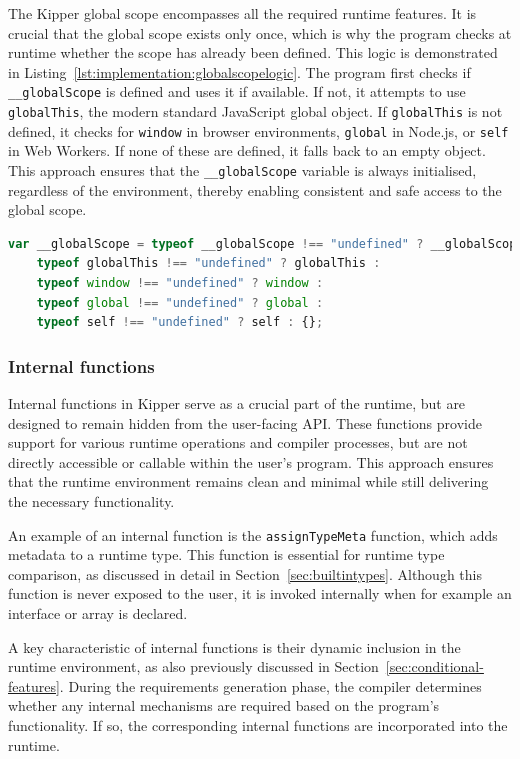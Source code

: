 The Kipper global scope encompasses all the required runtime features. It is crucial that the global scope exists only once, which is why the program checks at runtime whether the scope has already been defined. This logic is demonstrated in Listing~\ref{lst:implementation:globalscopelogic}. The program first checks if \lstinline|__globalScope| is defined and uses it if available. If not, it attempts to use \lstinline|globalThis|, the modern standard JavaScript global object. If \lstinline|globalThis| is not defined, it checks for \lstinline|window| in browser environments, \lstinline|global| in Node.js, or \lstinline|self| in Web Workers. If none of these are defined, it falls back to an empty object. This approach ensures that the \lstinline|__globalScope| variable is always initialised, regardless of the environment, thereby enabling consistent and safe access to the global scope.

\begin{lstlisting}[language=TypeScript,caption=Global Scope Logic,label=lst:implementation:globalscopelogic]
var __globalScope = typeof __globalScope !== "undefined" ? __globalScope :
    typeof globalThis !== "undefined" ? globalThis :
    typeof window !== "undefined" ? window :
    typeof global !== "undefined" ? global :
    typeof self !== "undefined" ? self : {};
\end{lstlisting}

\subsubsection{Internal functions}

Internal functions in Kipper serve as a crucial part of the runtime, but are designed to remain hidden from the user-facing API. These functions provide support for various runtime operations and compiler processes, but are not directly accessible or callable within the user's program. This approach ensures that the runtime environment remains clean and minimal while still delivering the necessary functionality.

An example of an internal function is the \lstinline|assignTypeMeta| function, which adds metadata to a runtime type. This function is essential for runtime type comparison, as discussed in detail in Section~\ref{sec:builtintypes}. Although this function is never exposed to the user, it is invoked internally when for example an interface or array is declared.

A key characteristic of internal functions is their dynamic inclusion in the runtime environment, as also previously discussed in Section~\ref{sec:conditional-features}. During the requirements generation phase, the compiler determines whether any internal mechanisms are required based on the program's functionality. If so, the corresponding internal functions are incorporated into the runtime.


